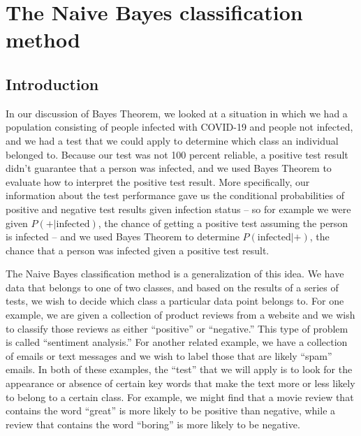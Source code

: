 \documentclass[
  11pt,
  letterpaper,
]{scrbook}
\theoremstyle{plain}
\theoremstyle{remark}
\begin{document}

\hypertarget{the-naive-bayes-classification-method}{%
\chapter{The Naive Bayes classification
method}\label{the-naive-bayes-classification-method}}


\hypertarget{introduction-2}{%
\section{Introduction}\label{introduction-2}}

In our discussion of Bayes Theorem, we looked at a situation in which we
had a population consisting of people infected with COVID-19 and people
not infected, and we had a test that we could apply to determine which
class an individual belonged to. Because our test was not 100 percent
reliable, a positive test result didn't guarantee that a person was
infected, and we used Bayes Theorem to evaluate how to interpret the
positive test result. More specifically, our information about the test
performance gave us the conditional probabilities of positive and
negative test results given infection status -- so for example we were
given \(P(+|\mathrm{infected})\), the chance of getting a positive test
assuming the person is infected -- and we used Bayes Theorem to
determine \(P(\mathrm{infected}|+)\), the chance that a person was
infected given a positive test result.

The Naive Bayes classification method is a generalization of this idea.
We have data that belongs to one of two classes, and based on the
results of a series of tests, we wish to decide which class a particular
data point belongs to. For one example, we are given a collection of
product reviews from a website and we wish to classify those reviews as
either ``positive'' or ``negative.'' This type of problem is called
``sentiment analysis.'' For another related example, we have a
collection of emails or text messages and we wish to label those that
are likely ``spam'' emails. In both of these examples, the ``test'' that
we will apply is to look for the appearance or absence of certain key
words that make the text more or less likely to belong to a certain
class. For example, we might find that a movie review that contains the
word ``great'' is more likely to be positive than negative, while a
review that contains the word ``boring'' is more likely to be negative.
\end{document}

